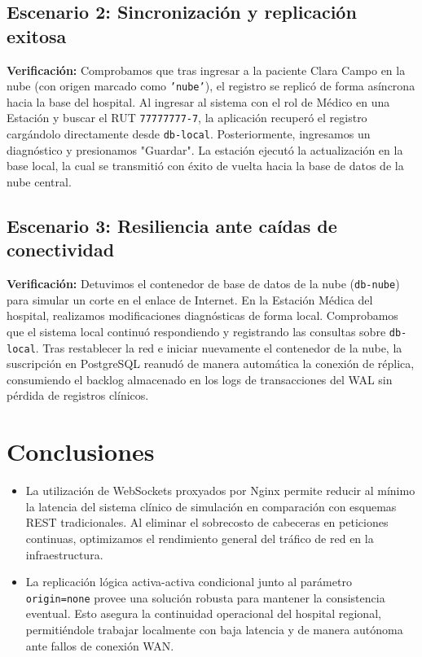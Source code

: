 \documentclass[11pt,a4paper]{article}
\begin{document}
\subsection{Escenario 2: Sincronización y replicación exitosa}
\textbf{Verificación:} Comprobamos que tras ingresar a la paciente Clara Campo en la nube (con origen marcado como \texttt{'nube'}), el registro se replicó de forma asíncrona hacia la base del hospital. Al ingresar al sistema con el rol de Médico en una Estación y buscar el RUT \texttt{77777777-7}, la aplicación recuperó el registro cargándolo directamente desde \texttt{db-local}. Posteriormente, ingresamos un diagnóstico y presionamos "Guardar". La estación ejecutó la actualización en la base local, la cual se transmitió con éxito de vuelta hacia la base de datos de la nube central.

\subsection{Escenario 3: Resiliencia ante caídas de conectividad}
\textbf{Verificación:} Detuvimos el contenedor de base de datos de la nube (\texttt{db-nube}) para simular un corte en el enlace de Internet. En la Estación Médica del hospital, realizamos modificaciones diagnósticas de forma local. Comprobamos que el sistema local continuó respondiendo y registrando las consultas sobre \texttt{db-local}. Tras restablecer la red e iniciar nuevamente el contenedor de la nube, la suscripción en PostgreSQL reanudó de manera automática la conexión de réplica, consumiendo el backlog almacenado en los logs de transacciones del WAL sin pérdida de registros clínicos.

\section{Conclusiones}
\begin{itemize}
    \item La utilización de WebSockets proxyados por Nginx permite reducir al mínimo la latencia del sistema clínico de simulación en comparación con esquemas REST tradicionales. Al eliminar el sobrecosto de cabeceras en peticiones continuas, optimizamos el rendimiento general del tráfico de red en la infraestructura.
    \item La replicación lógica activa-activa condicional junto al parámetro \texttt{origin=none} provee una solución robusta para mantener la consistencia eventual. Esto asegura la continuidad operacional del hospital regional, permitiéndole trabajar localmente con baja latencia y de manera autónoma ante fallos de conexión WAN.
\end{itemize}
\end{document}
